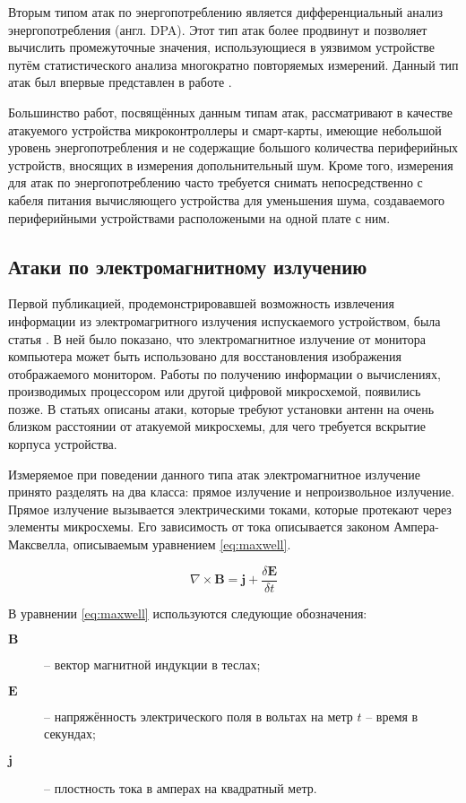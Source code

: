 Вторым типом атак по энергопотреблению является дифференциальный анализ
энергопотребления (англ. DPA). Этот тип атак более продвинут и позволяет
вычислить промежуточные значения, использующиеся в уязвимом устройстве путём
статистического анализа многократно повторяемых измерений. Данный тип атак был
впервые представлен в работе \cite{kocher-dpa}.

Большинство работ, посвящённых данным типам атак, рассматривают в качестве
атакуемого устройства микроконтроллеры и смарт-карты, имеющие небольшой уровень
энергопотребления и не содержащие большого количества периферийных устройств,
вносящих в измерения допольнительный шум. Кроме того, измерения для атак по
энергопотреблению часто требуется снимать непосредственно с кабеля питания
вычисляющего устройства для уменьшения шума, создаваемого периферийными
устройствами расположеными на одной плате с ним.

\subsection{Атаки по электромагнитному излучению}

Первой публикацией, продемонстрировавшей возможность извлечения информации
из электромагритного излучения испускаемого устройством, была статья
\cite{van-eck}. В ней было показано, что электромагнитное излучение от монитора
компьютера может быть использовано для восстановления изображения отображаемого
монитором. Работы по получению информации о вычислениях, производимых
процессором или другой цифровой микросхемой, появились позже. В статьях
\cite{ema1} \cite{ema2} описаны атаки, которые требуют установки антенн на очень
близком расстоянии от атакуемой микросхемы, для чего требуется вскрытие корпуса
устройства.

Измеряемое при поведении данного типа атак электромагнитное излучение принято
разделять на два класса: прямое излучение и непроизвольное излучение. Прямое
излучение вызывается электрическими токами, которые протекают через элементы
микросхемы. Его зависимость от тока описывается законом Ампера-Максвелла,
описываемым уравнением \ref{eq:maxwell}.

\begin{equation}
\nabla \times \mathbf{B} = \mathbf{j} + \frac{\delta \mathbf{E}}{\delta t}
\end{equation} \label{eq:maxwell}

В уравнении \ref{eq:maxwell} используются следующие обозначения:

\begin{description} 
\item[$\mathbf{B}$] -- вектор магнитной индукции в теслах;
\item[$\mathbf{E}$] -- напряжённость электрического поля в вольтах на метр $t$ -- время в секундах;
\item[$\mathbf{j}$] -- плостность тока в амперах на квадратный метр.
\end{description}

